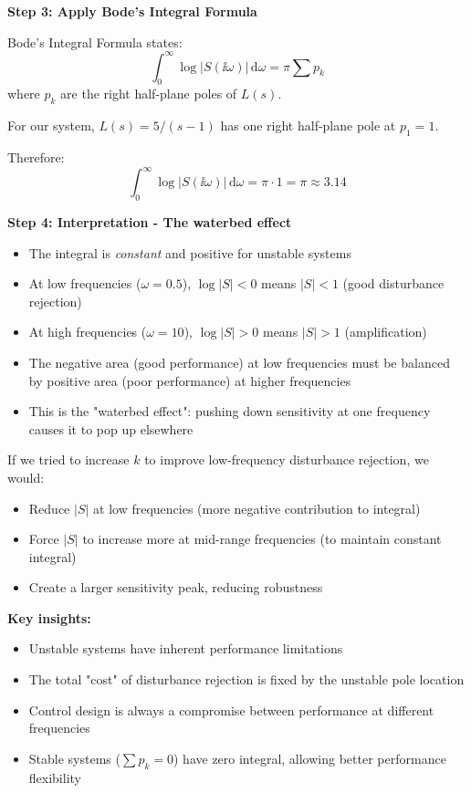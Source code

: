 \documentclass[11pt,a4paper]{article}
\begin{document}
\textbf{Step 3: Apply Bode's Integral Formula}

Bode's Integral Formula states:
\begin{equation}
\int_0^\infty \log|S(\ii\omega)|\,\mathrm{d}\omega = \pi \sum p_k
\end{equation}
where $p_k$ are the right half-plane poles of $L(s)$.

For our system, $L(s) = 5/(s-1)$ has one right half-plane pole at $p_1 = 1$.

Therefore:
\begin{equation}
\int_0^\infty \log|S(\ii\omega)|\,\mathrm{d}\omega = \pi \cdot 1 = \pi \approx 3.14
\end{equation}

\textbf{Step 4: Interpretation - The waterbed effect}

\begin{itemize}
\item The integral is \emph{constant} and positive for unstable systems
\item At low frequencies ($\omega = 0.5$), $\log|S| < 0$ means $|S| < 1$ (good disturbance rejection)
\item At high frequencies ($\omega = 10$), $\log|S| > 0$ means $|S| > 1$ (amplification)
\item The negative area (good performance) at low frequencies must be balanced by positive area (poor performance) at higher frequencies
\item This is the "waterbed effect": pushing down sensitivity at one frequency causes it to pop up elsewhere
\end{itemize}

If we tried to increase $k$ to improve low-frequency disturbance rejection, we would:
\begin{itemize}
\item Reduce $|S|$ at low frequencies (more negative contribution to integral)
\item Force $|S|$ to increase more at mid-range frequencies (to maintain constant integral)
\item Create a larger sensitivity peak, reducing robustness
\end{itemize}

\textbf{Key insights:}
\begin{itemize}
\item Unstable systems have inherent performance limitations
\item The total "cost" of disturbance rejection is fixed by the unstable pole location
\item Control design is always a compromise between performance at different frequencies
\item Stable systems ($\sum p_k = 0$) have zero integral, allowing better performance flexibility
\end{itemize}
\end{document}
